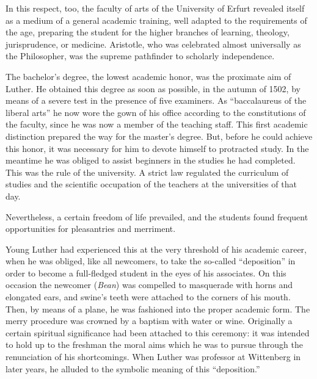 In this respect, too, the faculty of arts of the University of Erfurt
revealed itself as a medium of a general academic training, well
adapted to the requirements of the age, preparing the student for
the higher branches of learning, theology, jurisprudence, or medicine.
Aristotle, who was celebrated almost universally as the Philosopher,
was the supreme pathfinder to scholarly independence.

The bachelor’s degree, the lowest academic honor, was the proximate
aim of Luther. He obtained this degree as soon as possible, in the
autumn of 1502, by means of a severe test in the presence of five
examiners. As “baccalaureus of the liberal arts” he now wore the gown
of his office according to the constitutions of the faculty, since he was
now a member of the teaching staff. This first academic distinction
prepared the way for the master’s degree. But, before he could achieve
this honor, it was necessary for him to devote himself to protracted
study. In the meantime he was obliged to assist beginners in the
studies he had completed. This was the rule of the university. A strict
law regulated the curriculum of studies and the scientific occupation
of the teachers at the universities of that day.

Nevertheless, a certain freedom of life prevailed, and the students
found frequent opportunities for pleasantries and merriment.

Young Luther had experienced this at the very threshold of his
academic career, when he was obliged, like all newcomers, to take the
so-called “deposition” in order to become a full-fledged student in the
eyes of his associates. On this occasion the newcomer (\textit{Bean}) was compelled
to masquerade with horns and elongated ears, and swine’s teeth
were attached to the corners of his mouth. Then, by means of a plane,
he was fashioned into the proper academic form. The merry procedure
was crowned by a baptism with water or wine. Originally a certain
spiritual significance had been attached to this ceremony: it was
intended to hold up to the freshman the moral aims which he was to
pursue through the renunciation of his shortcomings. When Luther
was professor at Wittenberg in later years, he alluded to the symbolic
meaning of this “deposition.”

